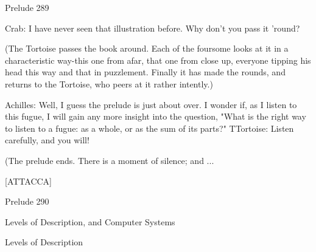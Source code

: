Prelude                                                                                  289

Crab: I have never seen that illustration before. Why don't you pass it 'round?

   (The Tortoise passes the book around. Each of the foursome looks at it in a
   characteristic way-this one from afar, that one from close up, everyone tipping his
   head this way and that in puzzlement. Finally it has made the rounds, and returns
   to the Tortoise, who peers at it rather intently.)

Achilles: Well, I guess the prelude is just about over. I wonder if, as I listen to this fugue,
  I will gain any more insight into the question, "What is the right way to listen to a
  fugue: as a whole, or as the sum of its parts?"
TTortoise: Listen carefully, and you will!

(The prelude ends. There is a moment of silence; and ...

                                                                                [ATTACCA]




Prelude                                                                                    290


                          Levels of Description,
                         and Computer Systems

                                Levels of Description

